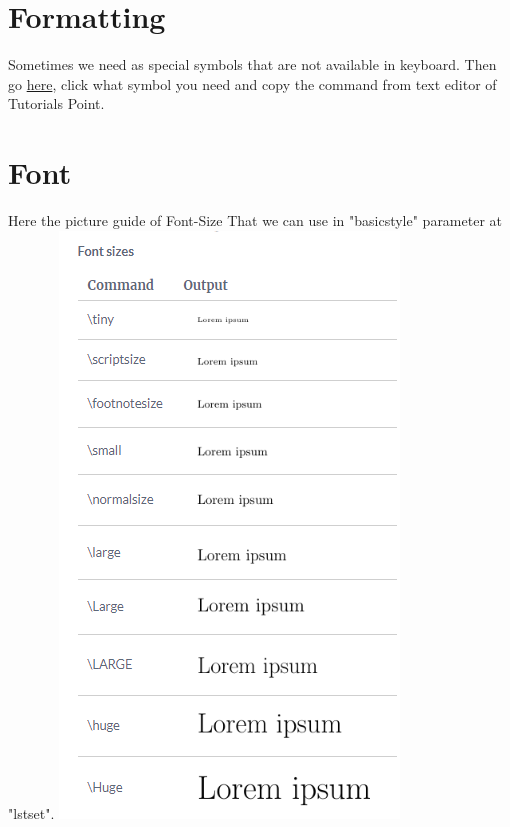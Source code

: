\documentclass[10 pt]{book}
\begin{document}
\begin{enumerate}
\section{Formatting}
Sometimes we need as special symbols that are not available in keyboard. Then go \href{https://www.tutorialspoint.com/online_latex_editor.php}{{\color{blue}here}}, click what symbol you need and copy the command from text editor of {\color{red}Tutorials Point}.

\section{Font}
Here the picture guide of Font-Size That we can use in "basicstyle" parameter at "lstset".
\includegraphics[scale=1]{../Font size.png} 


\end{enumerate}
\end{document}
